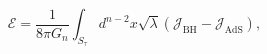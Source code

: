 \begin{equation}
\mathcal{E}=\frac{1}{8\pi G_n} \int_{S_\tau} d^{n-2}x \sqrt{\lambda}
\left(\mathcal{J}_\textrm{BH}-\mathcal{J}_\textrm{AdS} \right),
\end{equation}

